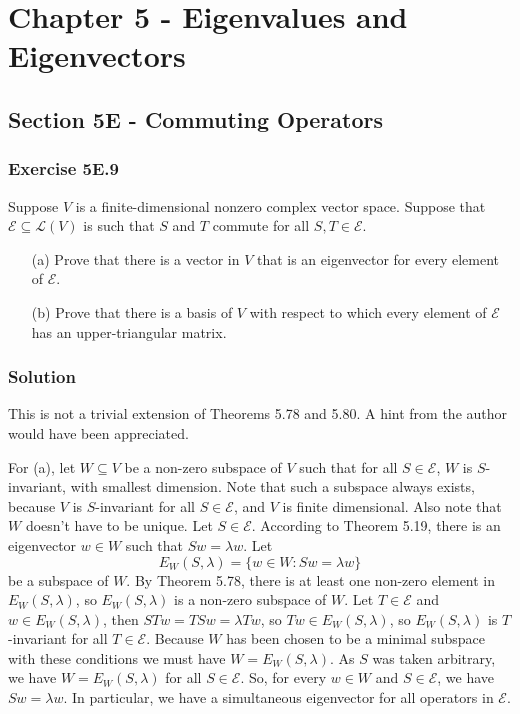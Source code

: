 \section*{Chapter 5 - Eigenvalues and Eigenvectors}

\subsection*{Section 5E - Commuting Operators}

\subsubsection*{Exercise 5E.9}

Suppose $V$ is a finite-dimensional nonzero complex vector space.
Suppose that $\mathcal{E} \subseteq \mathcal{L}(V)$ is such that $S$ and $T$ commute for all $S, T \in \mathcal{E}$.
\begin{itemize}
\item[(a)] Prove that there is a vector in $V$ that is an eigenvector for every element of $\mathcal{E}$.
\item[(b)] Prove that there is a basis of $V$ with respect to which every element of $\mathcal{E}$ has an upper-triangular matrix.
\end{itemize}

\subsubsection*{Solution}

This is not a trivial extension of Theorems 5.78 and 5.80.
A hint from the author would have been appreciated.

For (a), let $W \subseteq V$ be a non-zero subspace of $V$ such that for all $S \in \mathcal{E}$, $W$ is $S$-invariant, with smallest dimension.
Note that such a subspace always exists, because $V$ is $S$-invariant for all $S \in \mathcal{E}$, and $V$ is finite dimensional.
Also note that $W$ doesn't have to be unique.
Let $S \in \mathcal{E}$.
According to Theorem 5.19, there is an eigenvector $w \in W$ such that $Sw = \lambda w$.
Let
\begin{equation*}
    E_W(S, \lambda) = \{w \in W : Sw = \lambda w\}
\end{equation*}
be a subspace of $W$.
By Theorem 5.78, there is at least one non-zero element in $E_W(S, \lambda)$, so $E_W(S, \lambda)$ is a non-zero subspace of $W$.
Let $T \in \mathcal{E}$ and $w \in E_W(S, \lambda)$, then $STw = TSw = \lambda Tw$, so $Tw \in E_W(S, \lambda)$, so $E_W(S, \lambda)$ is $T$-invariant for all $T \in \mathcal{E}$.
Because $W$ has been chosen to be a minimal subspace with these conditions we must have $W = E_W(S, \lambda)$.
As $S$ was taken arbitrary, we have $W = E_W(S, \lambda)$ for all $S \in \mathcal{E}$.
So, for every $w \in W$ and $S \in \mathcal{E}$, we have $Sw = \lambda w$.
In particular, we have a simultaneous eigenvector for all operators in $\mathcal{E}$.

